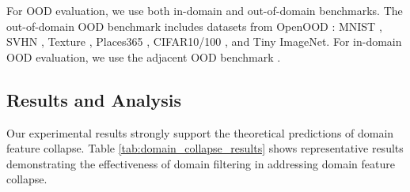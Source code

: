 \documentclass[11pt, oneside]{book}
\theoremstyle{plain}
\theoremstyle{definition}
\theoremstyle{remark}
\begin{document}
For OOD evaluation, we use both in-domain and out-of-domain benchmarks. The out-of-domain OOD benchmark includes datasets from OpenOOD \citep{zhang2023openood}: MNIST \citep{lecun1998gradient}, SVHN \citep{netzer2011reading}, Texture \citep{cimpoi2014describing}, Places365 \citep{zhou2017places}, CIFAR10/100 \citep{cifar10}, and Tiny ImageNet. For in-domain OOD evaluation, we use the adjacent OOD benchmark \citep{yangcan}.

\subsection{Results and Analysis}

Our experimental results strongly support the theoretical predictions of domain feature collapse. Table \ref{tab:domain_collapse_results} shows representative results demonstrating the effectiveness of domain filtering in addressing domain feature collapse.
\end{document}
